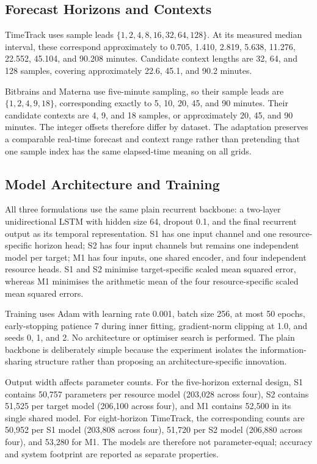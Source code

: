 \documentclass[a4paper,fleqn]{cas-dc}
\begin{document}
\subsection{Forecast Horizons and Contexts}
\label{sec:horizons-contexts}

TimeTrack uses sample leads
$\{1,2,4,8,16,32,64,128\}$.  At its measured median interval, these correspond
approximately to 0.705, 1.410, 2.819, 5.638, 11.276, 22.552, 45.104, and
90.208 minutes.  Candidate context lengths are 32, 64, and 128 samples,
covering approximately 22.6, 45.1, and 90.2 minutes.

Bitbrains and Materna use five-minute sampling, so their sample leads are
$\{1,2,4,9,18\}$, corresponding exactly to 5, 10, 20, 45, and 90 minutes.
Their candidate contexts are 4, 9, and 18 samples, or approximately 20, 45,
and 90 minutes.  The integer offsets therefore differ by dataset.  The
adaptation preserves a comparable real-time forecast and context range rather
than pretending that one sample index has the same elapsed-time meaning on all
grids.

\subsection{Model Architecture and Training}
\label{sec:architecture-training}

All three formulations use the same plain recurrent backbone: a two-layer
unidirectional LSTM with hidden size 64, dropout 0.1, and the final recurrent
output as its temporal representation.  S1 has one input channel and one
resource-specific horizon head; S2 has four input channels but remains one
independent model per target; M1 has four inputs, one shared encoder, and four
independent resource heads.  S1 and S2 minimise target-specific scaled mean
squared error, whereas M1 minimises the arithmetic mean of the four
resource-specific scaled mean squared errors.

Training uses Adam with learning rate 0.001, batch size 256, at most 50 epochs,
early-stopping patience 7 during inner fitting, gradient-norm clipping at 1.0,
and seeds 0, 1, and 2.  No architecture or optimiser search is performed.  The
plain backbone is deliberately simple because the experiment isolates the
information-sharing structure rather than proposing an architecture-specific
innovation.

Output width affects parameter counts.  For the five-horizon external design,
S1 contains 50,757 parameters per resource model (203,028 across four), S2
contains 51,525 per target model (206,100 across four), and M1 contains 52,500
in its single shared model.  For eight-horizon TimeTrack, the corresponding
counts are 50,952 per S1 model (203,808 across four), 51,720 per S2 model
(206,880 across four), and 53,280 for M1.  The models are therefore not
parameter-equal; accuracy and system footprint are reported as separate
properties.
\end{document}
